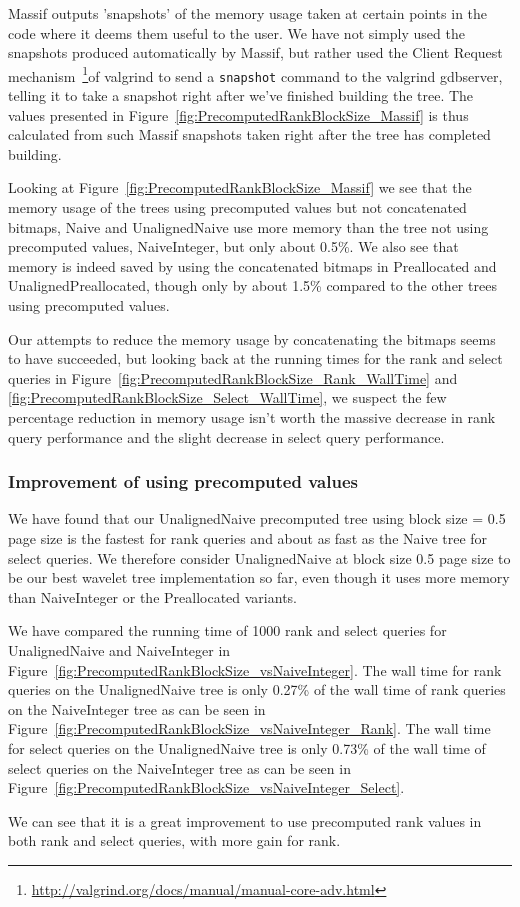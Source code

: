 Massif outputs 'snapshots' of the memory usage taken at certain points in the code where it deems them useful to the user.
We have not simply used the snapshots produced automatically by Massif, but rather used the Client Request mechanism~\footnote{\url{http://valgrind.org/docs/manual/manual-core-adv.html}}of valgrind to send a \texttt{snapshot} command to the valgrind gdbserver, telling it to take a snapshot right after we've finished building the tree.
The values presented in Figure~\ref{fig:PrecomputedRankBlockSize_Massif} is thus calculated from such Massif snapshots taken right after the tree has completed building.

Looking at Figure~\ref{fig:PrecomputedRankBlockSize_Massif} we see that the memory usage of the trees using precomputed values but not concatenated bitmaps, Naive and UnalignedNaive use more memory than the tree not using precomputed values, NaiveInteger, but only about 0.5\%.
We also see that memory is indeed saved by using the concatenated bitmaps in Preallocated and UnalignedPreallocated, though only by about 1.5\% compared to the other trees using precomputed values.

Our attempts to reduce the memory usage by concatenating the bitmaps seems to have succeeded, but looking back at the running times for the rank and select queries in Figure~\ref{fig:PrecomputedRankBlockSize_Rank_WallTime} and \ref{fig:PrecomputedRankBlockSize_Select_WallTime}, we suspect the few percentage reduction in memory usage isn't worth the massive decrease in rank query performance and the slight decrease in select query performance.


\subsubsection{Improvement of using precomputed values}
We have found that our UnalignedNaive precomputed tree using block size = 0.5 page size is the fastest for rank queries and about as fast as the Naive tree for select queries.
We therefore consider UnalignedNaive at block size 0.5 page size to be our best wavelet tree implementation so far, even though it uses more memory than NaiveInteger or the Preallocated variants.

We have compared the running time of 1000 rank and select queries for UnalignedNaive and NaiveInteger in Figure~\ref{fig:PrecomputedRankBlockSize_vsNaiveInteger}.
The wall time for rank queries on the UnalignedNaive tree is only 0.27\% of the wall time of rank queries on the NaiveInteger tree as can be seen in Figure~\ref{fig:PrecomputedRankBlockSize_vsNaiveInteger_Rank}.
The wall time for select queries on the UnalignedNaive tree is only 0.73\% of the wall time of select queries on the NaiveInteger tree as can be seen in Figure~\ref{fig:PrecomputedRankBlockSize_vsNaiveInteger_Select}.

We can see that it is a great improvement to use precomputed rank values in both rank and select queries, with more gain for rank.

